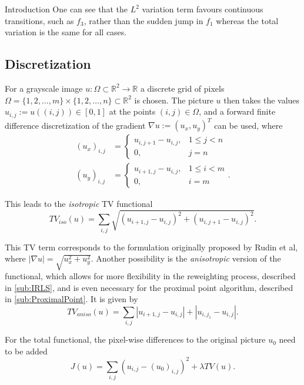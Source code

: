 \begin{chapter}{Introduction}
One can see that the $L^2$ variation term favours continuous transitions, such as $f_3$, rather than the sudden jump in $f_1$ whereas the total variation is the same for
all cases.


\subsection{Discretization} %
\label{sub:Discretization}
For a grayscale image $u:\Omega\subset\mathbb{R}^2\to\mathbb{R}$ a discrete grid of pixels 
$\Omega=\lbrace 1,2,\ldots,m\rbrace\times\lbrace1,2,\ldots,n\rbrace\subset\mathbb{R}^2$ is chosen. The picture $u$ then takes the values $u_{i,j}:=u((i,j))\in [0,1]$
at the points $(i,j)\in\Omega$, and a forward finite difference discretization of the gradient $\nabla u:=(u_x,u_y)^T$ can be used, where
\begin{align}
    (u_x)_{i,j} &= 
	\begin{cases}
	u_{i,j+1}-u_{i,j}, & 1\leq j < n \\
	0, & j=n 
	\end{cases} \\
    (u_y)_{i,j} &= 
	\begin{cases}
	u_{i+1,j}-u_{i,j}, & 1\leq i < m \\
	0, &i=m
	\end{cases}.\nonumber
\end{align}

This leads to the \emph{isotropic} TV functional
\begin{equation}
    \label{eq:original_isofunctional}
    TV_{iso}(u)=\sum_{i,j}\sqrt{(u_{i+1,j}-u_{i,j})^{2}+(u_{i,j+1}-u_{i,j})^{2}}.
\end{equation}

This TV term corresponds to the formulation originally proposed by Rudin et al\cite{RudinOsher}, where $\left\vert\nabla u\right\vert=\sqrt{u_x^{2}+u_y^{2} }$.
Another possibility is the \emph{anisotropic} version of the functional, which allows for more flexibility in the reweighting process, described in \ref{sub:IRLS}, and is even necessary for the proximal point algorithm, described in \ref{sub:ProximalPoint}.
It is given by
\begin{equation}
    \label{eq:original_anisofunctional}
    TV_{aniso}(u)=\sum_{i,j}|u_{i+1,j}-u_{i,j}|+|u_{i,j_1}-u_{i,j}|.
\end{equation}

For the total functional, the pixel-wise differences to the original picture $u_0$ need to be added
\begin{equation}
    \label{eq:original_functional}
    J(u)=\sum_{i,j}(u_{i,j}-(u_0)_{i,j})^2 + \lambda TV(u).
\end{equation}



\end{chapter}
